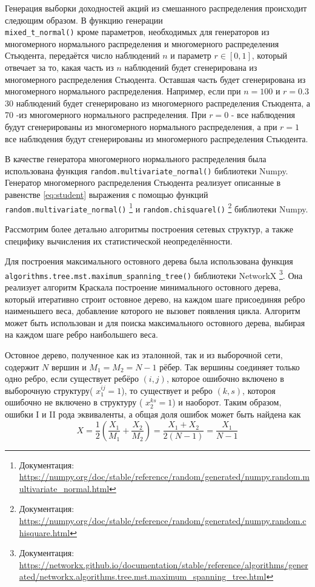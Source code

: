 Генерация выборки доходностей акций из смешанного распределения происходит следющим образом. В функцию генерации\\
\verb|mixed_t_normal()| кроме параметров, необходимых для генераторов из многомерного нормального распределения и многомерного распределения Стьюдента, передаётся число наблюдений $n$ и параметр $r \in [0,1]$, который отвечает за то, какая часть из $n$ наблюдений будет сгенерирована из многомерного распределения Стьюдента. Оставшая часть будет сгенерирована из многомерного нормального распределения. Например, если при $n=100$ и $r=0.3$ 30 наблюдений будет сгенерировано из многомерного распределения Стьюдента, а 70 -из многомерного нормального распределения. При $r=0$ - все наблюдения будут сгенерированы из многомерного нормального распределения, а при  $r=1$ все наблюдения будут сгенерированы из многомерного распределения Стьюдента. 

В качестве генератора многомерного нормального распределения  была использована функция \verb|random.multivariate_normal()| библиотеки Numpy. Генератор многомерного распределения Стьюдента реализует описанные в равенстве \ref{eq:student} выражения с помощью функций \verb|random.multivariate_normal()| \footnote{Документация:  \url{https://numpy.org/doc/stable/reference/random/generated/numpy.random.multivariate_normal.html}} и  \verb|random.chisquarel()| \footnote{Документация:  \url{https://numpy.org/doc/stable/reference/random/generated/numpy.random.chisquare.html}} библиотеки Numpy.

Рассмотрим более детально алгоритмы построения сетевых структур, а также специфику вычисления их статистической неопределённости.

Для построения максимального остовного дерева была использована  функция \verb|algorithms.tree.mst.maximum_spanning_tree()| библиотеки NetworkX \footnote{Документация:  \url{https://networkx.github.io/documentation/stable/reference/algorithms/generated/networkx.algorithms.tree.mst.maximum_spanning_tree.html}}. Она реализует алгоритм Краскала\cite{kruskal} построение минимального остовного дерева, который итеративно строит остовное дерево, на каждом шаге присоединяя ребро наименьшего веса, добавление которого не вызовет появления цикла. Алгоритм может быть использован и для поиска максимального остовного дерева,  выбирая на каждом шаге ребро наибольшего веса.

Остовное дерево, полученное как из эталонной, так и из выборочной сети, содержит $N$ вершин и $M_1 = M_2 = N-1$ рёбер. Так вершины соединяет только одно ребро, если существует ребёро $(i,j)$, которое ошибочно включено в выборочную структуру( $x^{i j}_1=1$), то существует и ребро  $(k,s)$, котороя ошибочно не включено в структуру ( $x^{k s}_2=1$) и наоборот. Таким образом, ошибки I и II рода эквиваленты, а общая доля ошибок может быть найдена как
\begin{equation}
X = \frac{1}{2}\left(\frac{X_1}{M_1} + \frac{X_2}{M_2}\right) = \frac{X_1 + X_2}{2(N-1)} = \frac{X_1}{N-1}
\end{equation}

